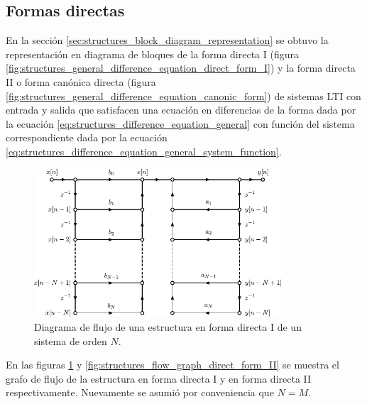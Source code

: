 \documentclass[a4paper]{report}
\begin{document}
\subsection{Formas directas}

En la sección \ref{sec:structures_block_diagram_representation} se obtuvo la representación en diagrama de bloques de la forma directa I (figura \ref{fig:structures_general_difference_equation_direct_form_I}) y la forma directa II o forma canónica directa (figura \ref{fig:structures_general_difference_equation_canonic_form}) de sistemas LTI con entrada y salida que satisfacen una ecuación en diferencias de la forma dada por la ecuación \ref{eq:structures_difference_equation_general} con función del sistema correspondiente dada por la ecuación \ref{eq:structures_difference_equation_general_system_function}.
\begin{figure}[!htb]
 \begin{center}
 \includegraphics[width=0.82\textwidth]{figuras/structures_flow_graph_direct_form_I.pdf}
 \caption{\label{fig:structures_flow_graph_direct_form_I} Diagrama de flujo de una estructura en forma directa I de un sistema de orden \(N\).}
 \end{center}
\end{figure}
En las figuras \ref{fig:structures_flow_graph_direct_form_I} y \ref{fig:structures_flow_graph_direct_form_II} se muestra el grafo de flujo de la estructura en forma directa I y en forma directa II respectivamente. Nuevamente se asumió por conveniencia que \(N=M\).
\end{document}
